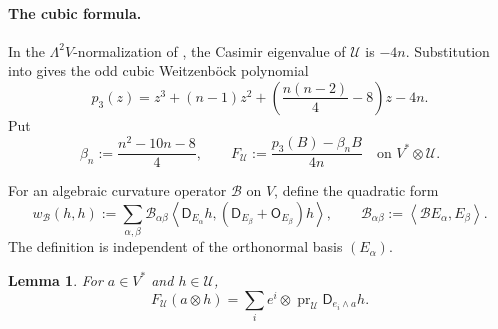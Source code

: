 \documentclass[reqno,11pt]{amsart}
\newtheorem{lemma}[theorem]{Lemma}
\theoremstyle{definition}
\newcommand{\cB}{\mathcal B}
\newcommand{\cU}{\mathcal U}
\newcommand{\inner}[2]{\left\langle #1,#2\right\rangle}
\begin{document}
\paragraph{The cubic formula.}

In the $\Lambda^2V$-normalization of
\cite[\S3.2]{SemmelmannWeingart10}, the Casimir eigenvalue of
$\cU$ is $-4n$. Substitution into \cite[(4.18)]{SemmelmannWeingart10}
gives the odd cubic Weitzenb\"ock polynomial
\begin{equation}\label{eq:p3-polynomial}
  p_3(z)=z^3+(n-1)z^2+
  \left(\frac{n(n-2)}4-8\right)z-4n.
\end{equation}
Put
\begin{equation}\label{eq:partial-formula}
  \beta_n:=\frac{n^2-10n-8}{4},
  \qquad
  F_{\cU}:=\frac{p_3(B)-\beta_nB}{4n}
  \quad\text{on }V^*\otimes\cU.
\end{equation}

For an algebraic curvature operator $\cB$ on $V$, define the quadratic form
\begin{equation}\label{eq:wR-definition}
  w_{\cB}(h,h)
  :=\sum_{\alpha,\beta}\cB_{\alpha\beta}
  \inner{\mathsf D_{E_\alpha}h}{(\mathsf D_{E_\beta}+\mathsf O_{E_\beta})h},
  \qquad
  \cB_{\alpha\beta}:=\inner{\cB E_\alpha}{E_\beta}.
\end{equation}
The definition is independent of the orthonormal basis $(E_\alpha)$.

\begin{lemma}\label{lem:first-three-slot-action}
For $a\in V^*$ and $h\in\cU$,
\begin{equation}\label{eq:first-three-slot-action}
  F_{\cU}(a\otimes h)
  =\sum_i e^i\otimes\operatorname{pr}_{\cU}
     \mathsf D_{e_i\wedge a}h.
\end{equation}
\end{lemma}
\end{document}

